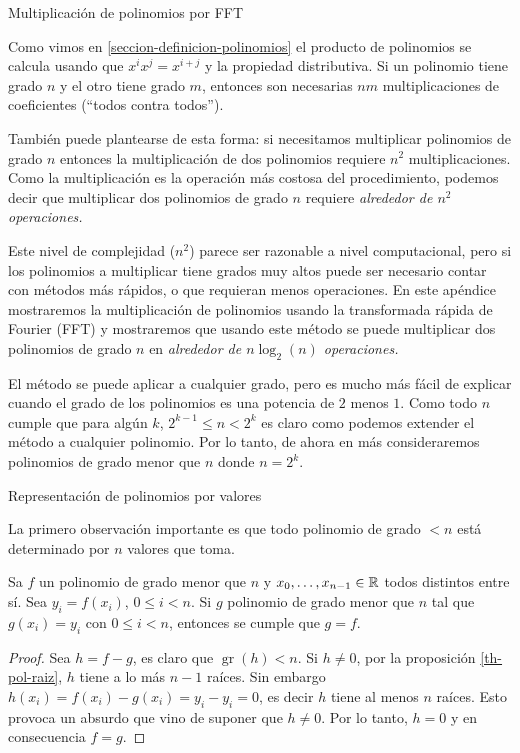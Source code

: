     \begin{chapter}{Multiplicación de polinomios por FFT}\label{apend.FFT}
    

        Como vimos en \ref{seccion-definicion-polinomios} el producto de polinomios se calcula usando  que $x^ix^j = x^{i+j}$ y la propiedad distributiva. Si un polinomio tiene grado $n$ y el otro  tiene grado $m$,  entonces son necesarias $nm$ multiplicaciones de coeficientes (``todos contra todos''). 
        
        También puede plantearse de esta forma:  si necesitamos multiplicar polinomios de grado $n$  entonces la multiplicación de dos polinomios requiere $n^2$ multiplicaciones. Como la multiplicación es la operación más costosa del procedimiento, podemos decir  que  multiplicar dos polinomios de grado $n$ requiere \textit{alrededor de  $n^2$ operaciones.}

        Este nivel de complejidad ($n^2$) parece ser razonable a nivel computacional, pero  si los polinomios a multiplicar tiene grados muy altos puede ser necesario contar con métodos más rápidos, o que requieran menos operaciones. En  este apéndice mostraremos la multiplicación de polinomios usando  la transformada rápida de Fourier (FFT) y mostraremos que usando este método se puede multiplicar dos polinomios de grado $n$ en \textit{alrededor de  $n\log_2(n)$ operaciones.}  

        El  método se puede aplicar a cualquier grado, pero es mucho más fácil de explicar cuando el grado de los polinomios es una potencia de $2$  menos $1$. Como todo $n$ cumple que para algún $k$, $2^{k-1} \le n < 2^k$ es claro como podemos extender el método a cualquier polinomio. Por lo tanto, de ahora en más consideraremos polinomios de grado menor que $n$ donde  $n = 2^k$. 

\begin{section}{Representación de polinomios por valores}
    
        La primero observación importante es que todo polinomio de grado  $<n$  está determinado por $n$ valores que toma.

        \begin{proposicion}\label{prop-polinomios-por-valor}
            Sa $f$ un polinomio de grado  menor  que $n$ y $x_0,\ldots,x_{n-1} \in \mathbb R$ todos distintos entre sí. Sea $y_i = f(x_i)$, $0 \le i < n$. Si $g$ polinomio de grado menor que $n$ tal que $g(x_i) = y_i$ con  $0 \le i < n$, entonces se cumple que $g=f$.
        \end{proposicion}
        \begin{proof} Sea $h = f- g$,  es claro que $\operatorname{gr}(h) < n$. Si $h \ne 0$, por la proposición \ref{th-pol-raiz}, $h$ tiene a lo más $n-1$ raíces. Sin embargo $h(x_i)= f(x_i)-g(x_i) = y_i -y_i =0$,  es decir $h$ tiene al menos $n$ raíces. Esto provoca un absurdo que vino de suponer que $h \ne 0$. Por lo tanto,  $h=0$ y en consecuencia $f=g$.   
        \end{proof}


\end{section}
\end{chapter}
